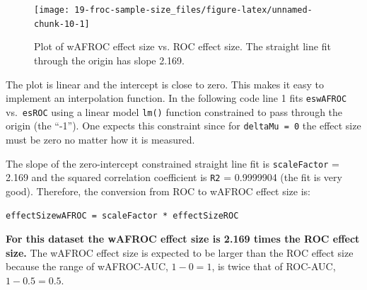 \documentclass[
]{book}
\newenvironment{Shaded}{\begin{snugshade}}{\end{snugshade}}
\newcommand{\CommentTok}[1]{\textcolor[rgb]{0.56,0.35,0.01}{\textit{#1}}}
\newcommand{\DecValTok}[1]{\textcolor[rgb]{0.00,0.00,0.81}{#1}}
\newcommand{\FloatTok}[1]{\textcolor[rgb]{0.00,0.00,0.81}{#1}}
\newcommand{\FunctionTok}[1]{\textcolor[rgb]{0.00,0.00,0.00}{#1}}
\newcommand{\NormalTok}[1]{#1}
\newcommand{\OtherTok}[1]{\textcolor[rgb]{0.56,0.35,0.01}{#1}}
\newcommand{\SpecialCharTok}[1]{\textcolor[rgb]{0.00,0.00,0.00}{#1}}
\begin{document}
\begin{figure}

{\centering \texttt{[image: 19-froc-sample-size\_files/figure-latex/unnamed-chunk-10-1]} 

}

\caption{Plot of wAFROC effect size vs. ROC effect size. The straight line fit through the origin has slope 2.169.}\label{fig:unnamed-chunk-10}
\end{figure}

The plot is linear and the intercept is close to zero. This makes it easy to implement an interpolation function. In the following code line 1 fits \texttt{eswAFROC} vs.~\texttt{esROC} using a linear model \texttt{lm()} function constrained to pass through the origin (the ``-1''). One expects this constraint since for \texttt{deltaMu\ =\ 0} the effect size must be zero no matter how it is measured.

\begin{Shaded}
\end{Shaded}

The slope of the zero-intercept constrained straight line fit is \texttt{scaleFactor} = 2.169 and the squared correlation coefficient is \texttt{R2} = 0.9999904 (the fit is very good). Therefore, the conversion from ROC to wAFROC effect size is:

\begin{verbatim}
effectSizewAFROC = scaleFactor * effectSizeROC
\end{verbatim}

\textbf{For this dataset the wAFROC effect size is 2.169 times the ROC effect size.} The wAFROC effect size is expected to be larger than the ROC effect size because the range of wAFROC-AUC, \(1-0=1\), is twice that of ROC-AUC, \(1-0.5=0.5\).
\end{document}
